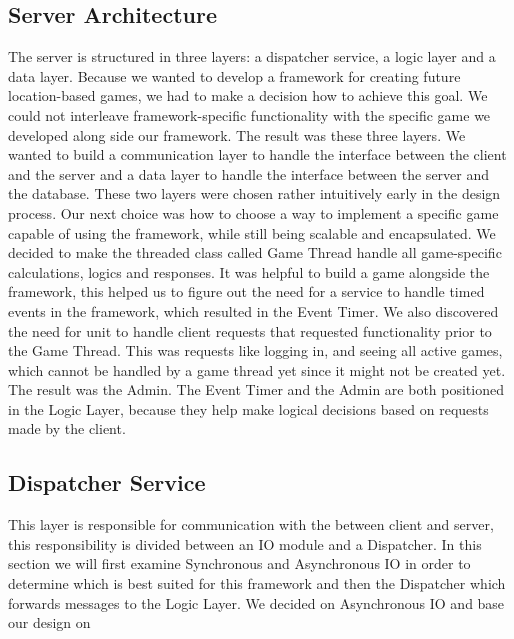 \subsection{Server Architecture}
\label{sec:server}

The server is structured in three layers: a dispatcher service, a logic layer and a data layer. Because we wanted to develop a framework for creating future location-based games, we had to make a decision how to achieve this goal. We could not interleave framework-specific functionality with the specific game we developed along side our framework. The result was these three layers. We wanted to build a communication layer to handle the interface between the client and the server and a data layer to handle the interface between the server and the database. These two layers were chosen rather intuitively early in the design process. Our next choice was how to choose a way to implement a specific game capable of using the framework, while still being scalable and encapsulated. We decided to make the threaded class called Game Thread handle all game-specific calculations, logics and responses. 
It was helpful to build a game alongside the framework, this helped us to figure out the need for a service to handle timed events in the framework, which resulted in the Event Timer. We also discovered the need for unit to handle client requests that requested functionality prior to the Game Thread. This was requests like logging in, and seeing all active games, which cannot be handled by a game thread yet since it might not be created yet. The result was the Admin. The Event Timer and the Admin are both positioned in the Logic Layer, because they help make logical decisions based on requests made by the client. 



\subsection{Dispatcher Service}
This layer is responsible for communication with the between client and server, this responsibility is divided between an IO module and a Dispatcher. In this section we will first examine Synchronous and Asynchronous IO in order to determine which is best suited for this framework and then the Dispatcher which forwards messages to the Logic Layer. We decided on Asynchronous IO and base our design on \cite{?} 	 %

